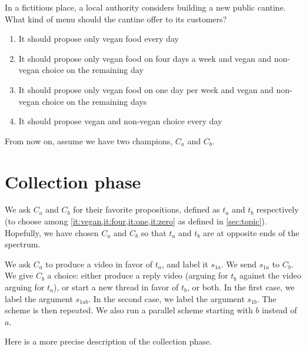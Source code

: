 \documentclass[version=3.21, pagesize, twoside=off, bibliography=totoc, DIV=calc, fontsize=12pt, a4paper]{scrartcl}
\begin{document}
In a fictitious place, a local authority considers building a new public cantine. What kind of menu should the cantine offer to its customers?
\begin{enumerate}
	\item \label{it:vegan} It should propose only vegan food every day
	\item \label{it:four} It should propose only vegan food on four days a week and vegan and non-vegan choice on the remaining day
	\item \label{it:one} It should propose only vegan food on one day per week and vegan and non-vegan choice on the remaining days
	\item \label{it:zero} It should propose vegan and non-vegan choice every day
\end{enumerate}

From now on, assume we have two champions, $C_a$ and $C_b$.

\section{Collection phase}
We ask $C_a$ and $C_b$ for their favorite propositions, defined as $t_a$ and $t_b$ respectively (to choose among \cref{it:vegan,it:four,it:one,it:zero} as defined in \cref{sec:topic}). Hopefully, we have chosen $C_a$ and $C_b$ so that $t_a$ and $t_b$ are at opposite ends of the spectrum.

We ask $C_a$ to produce a video in favor of $t_a$, and label it $s_{1a}$. We send $s_{1a}$ to $C_b$. We give $C_b$ a choice: either produce a reply video (arguing for $t_b$ against the video arguing for $t_a$), or start a new thread in favor of $t_b$, or both. In the first case, we label the argument $s_{1ab}$. In the second case, we label the argument $s_{1b}$. The scheme is then repeated. We also run a parallel scheme starting with $b$ instead of $a$.

Here is a more precise description of the collection phase.
\end{document}
